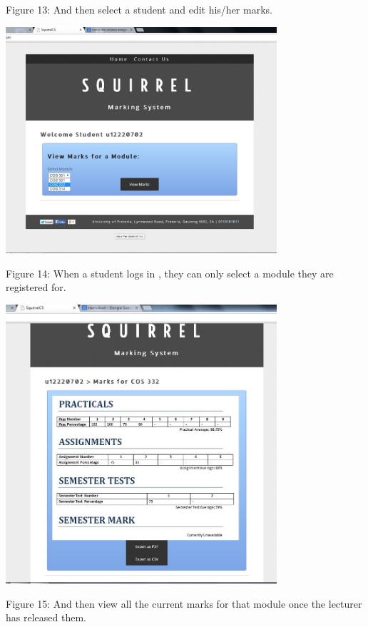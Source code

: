 \documentclass[a4paper]{article}
\begin{document}
\begin{center}
Figure 13: And then select a student and edit his/her marks.
\end{center}
\includegraphics[width=380px]{Images/WEBUIStudent_SelectModule.jpg}
\begin{center}
Figure 14: When a student logs in , they can only select a module they are registered for.
\end{center}
\includegraphics[width=380px]{Images/WEBUIStudent_ViewMarks.jpg}
\begin{center}
Figure 15: And then view all the current marks for that module once the lecturer has released them.
\end{center}
\end{document}
